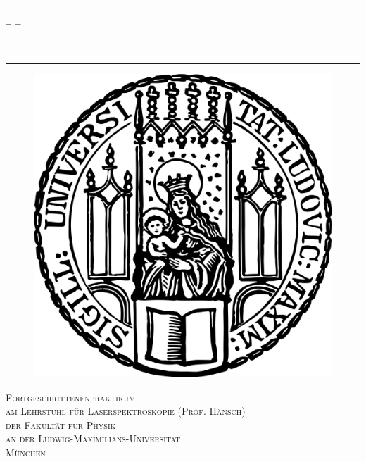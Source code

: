 \begin{titlepage}   

   {\sffamily
    {\parindent0cm
    \rule{\linewidth}{.7ex}}  
  \begin{center}
    {\Huge \bfseries \getTitle{}}
    
    \vspace*{2ex}
    {\Large \bfseries -- \getSubtitle{} --}
    
    {\large\bfseries \getAuthorOne{}\\}
    {\large\bfseries \getAuthorTwo{}}
    
  \end{center}
    \rule{\linewidth}{.7ex}
    
  \begin{figure}[!h]
    \centering
    \includegraphics[scale = 0.1]{figures/lmu-siegel.png}
  \end{figure}
    
  \begin{center}
    {\large \scshape Fortgeschrittenenpraktikum\\
     am Lehrstuhl für Laserspektroskopie (Prof. Hänsch)\\
     der Fakultät für Physik\\
     an der Ludwig-Maximilians-Universität\\
     München}
  \end{center}
   }
\end{titlepage}

\cleardoublepage
